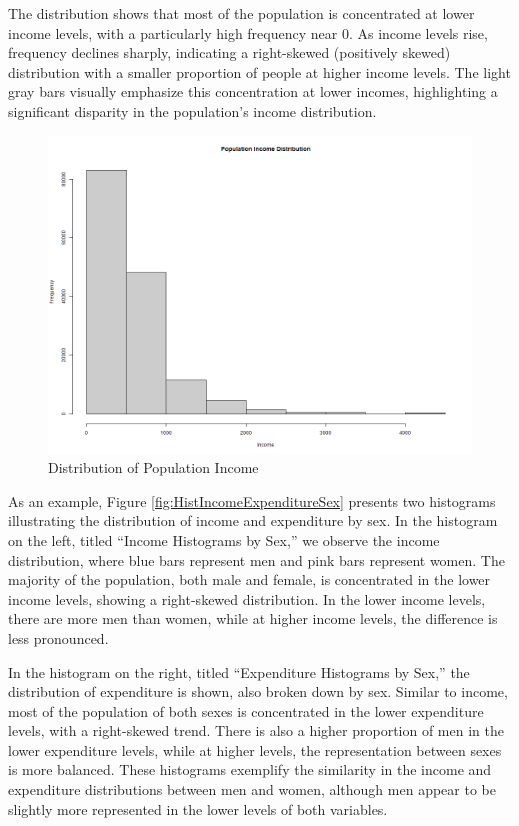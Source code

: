 \documentclass[
  12pt,
]{book}
\begin{document}
The distribution shows that most of the population is concentrated at lower income levels, with a particularly high frequency near 0. As income levels rise, frequency declines sharply, indicating a right-skewed (positively skewed) distribution with a smaller proportion of people at higher income levels. The light gray bars visually emphasize this concentration at lower incomes, highlighting a significant disparity in the population's income distribution.

\begin{figure}
\includegraphics[width=14.22in]{www/05_graficas/01_hist_ingreso} \caption{Distribution of Population Income}\label{fig:histIncome}
\end{figure}

As an example, Figure \ref{fig:HistIncomeExpenditureSex} presents two histograms illustrating the distribution of income and expenditure by sex. In the histogram on the left, titled ``Income Histograms by Sex,'' we observe the income distribution, where blue bars represent men and pink bars represent women. The majority of the population, both male and female, is concentrated in the lower income levels, showing a right-skewed distribution. In the lower income levels, there are more men than women, while at higher income levels, the difference is less pronounced.

In the histogram on the right, titled ``Expenditure Histograms by Sex,'' the distribution of expenditure is shown, also broken down by sex. Similar to income, most of the population of both sexes is concentrated in the lower expenditure levels, with a right-skewed trend. There is also a higher proportion of men in the lower expenditure levels, while at higher levels, the representation between sexes is more balanced. These histograms exemplify the similarity in the income and expenditure distributions between men and women, although men appear to be slightly more represented in the lower levels of both variables.
\end{document}
